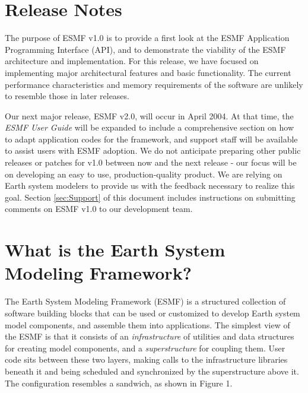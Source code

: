 
\section{Release Notes}

The purpose of ESMF v1.0 is to provide a first look at the ESMF
Application Programming Interface (API), and to demonstrate the viability 
of the ESMF architecture and implementation.  For this release, we have focused 
on implementing major architectural features and basic functionality.  The 
current performance characteristics and memory requirements of the software 
are unlikely to resemble those in later releases.

Our next major release, ESMF v2.0, will occur in April 2004.  At that time, 
the {\it ESMF User Guide} will be expanded to include a comprehensive section 
on how to adapt application codes for the framework, and support staff will be 
available to assist users with ESMF adoption.  We do not anticipate preparing other public
releases or patches for v1.0 between now and the next release - our focus
will be on developing an easy to use, production-quality product.  We are 
relying on Earth system modelers to provide us with the feedback necessary 
to realize this goal.  Section \ref{sec:Support} of this document includes 
instructions on submitting comments on ESMF v1.0 to our development team.

\section{What is the Earth System Modeling Framework?}

The Earth System Modeling Framework (ESMF) is a structured collection of 
software building blocks that can be used or customized to develop 
Earth system model components, and assemble them into applications.  
The simplest view of the ESMF is that it consists of an
{\it infrastructure} of utilities and data structures for creating 
model components, and a {\it superstructure} for coupling them.  
User code sits between these two layers, making calls to the infrastructure
libraries beneath it and being scheduled and synchronized by the 
superstructure above it.  The configuration resembles a sandwich, as
shown in Figure 1.

